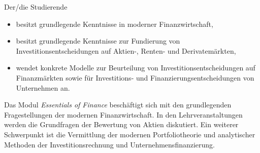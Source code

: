 \begin{module}
\begin{styleenv}
\end{styleenv}

\begin{learningoutcomes}
Der/die Studierende

 \begin{itemize}\item besitzt grundlegende Kenntnisse in moderner Finanzwirtschaft,  \item besitzt grundlegende Kenntnisse zur Fundierung von Investitionsentscheidungen auf Aktien-, Renten- und Derivatemärkten,  \item wendet konkrete Modelle zur Beurteilung von Investitionsentscheidungen auf Finanzmärkten sowie für Investitions- und Finanzierungsentscheidungen von Unternehmen an.  \end{itemize}
\end{learningoutcomes}

\begin{content}
Das Modul \emph{Essentials of Finance} beschäftigt sich mit den grundlegenden Fragestellungen der modernen Finanzwirtschaft. In den Lehrveranstaltungen werden die Grundfragen der Bewertung von Aktien diskutiert. Ein weiterer Schwerpunkt ist die Vermittlung der modernen Portfoliotheorie und analytischer Methoden der Investitionsrechnung und Unternehmensfinanzierung.


\end{content}



\end{module}

